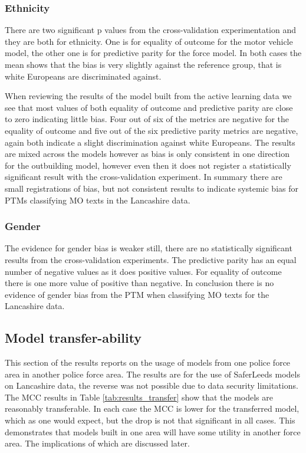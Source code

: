 \subsubsection{Ethnicity} There are two significant p values from the cross-validation experimentation and they are both for ethnicity. One is for equality of outcome for the motor vehicle model, the other one is for predictive parity for the force model. In both cases the mean shows that the bias is very slightly against the reference group, that is white Europeans are discriminated against. 

When reviewing the results of the model built from the active learning data we see that most values of both equality of outcome and predictive parity are close to zero indicating little bias. Four out of six of the metrics are negative for the equality of outcome and five out of the six predictive parity metrics are negative, again both indicate a slight discrimination against white Europeans. The results are mixed across the models however as bias is only consistent in one direction for the outbuilding model, however even then it does not register a statistically significant result with the cross-validation experiment. In summary there are small registrations of bias, but not consistent results to indicate systemic bias for PTMs classifying MO texts in the Lancashire data.
 
\subsubsection{Gender} The evidence for gender bias is weaker still, there are no statistically significant results from the cross-validation experiments. The predictive parity has an equal number of negative values as it does positive values. For equality of outcome there is one more value of positive than negative. In conclusion there is no evidence of gender bias from the PTM when classifying MO texts for the Lancashire data.




\subsection{Model transfer-ability} This section of the results reports on the usage of models from one police force area in another police force area. The results are for  the use of SaferLeeds models on Lancashire data, the reverse was not possible due to data security limitations. The MCC results in Table \ref{tab:results_transfer} show that the models are reasonably transferable. In each case the MCC is lower for the transferred model, which as one would expect, but the drop is not that significant in all cases. This demonstrates that models built in one area will have some utility in another force area. The implications of which are discussed later.  


